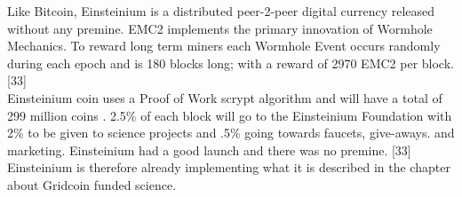 Like Bitcoin, Einsteinium is a distributed peer-2-peer digital currency released without any premine. EMC2 implements the primary innovation of Wormhole Mechanics. To reward long term miners each Wormhole Event occurs randomly during each epoch and is 180 blocks long; with a reward of 2970 EMC2 per block. [33]\\


Einsteinium coin uses a Proof of Work scrypt algorithm and will have a total of 299 million coins . 2.5\% of each block will go to the Einsteinium Foundation with 2\% to be given to science projects and .5\% going towards faucets, give-aways. and marketing. Einsteinium had a good launch and there was no premine. [33]\\
 
Einsteinium is therefore already implementing what it is described in the chapter about Gridcoin funded science.
